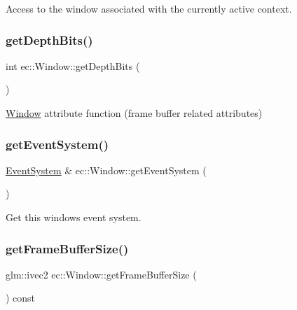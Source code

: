 Access to the window associated with the currently active context. \mbox{\label{classec_1_1_window_a3a30627927e3a7e113100cf43cae340b}} 
\subsubsection{\texorpdfstring{get\+Depth\+Bits()}{getDepthBits()}}
{\footnotesize\ttfamily int ec\+::\+Window\+::get\+Depth\+Bits (\begin{DoxyParamCaption}{ }\end{DoxyParamCaption})\hspace{0.3cm}{\ttfamily [static]}}

\mbox{\hyperlink{classec_1_1_window}{Window}} attribute function (frame buffer related attributes) \mbox{\label{classec_1_1_window_a9dda11a247352aa51fea720076174535}} 
\subsubsection{\texorpdfstring{get\+Event\+System()}{getEventSystem()}}
{\footnotesize\ttfamily \mbox{\hyperlink{classec_1_1_event_system}{Event\+System}} \& ec\+::\+Window\+::get\+Event\+System (\begin{DoxyParamCaption}{ }\end{DoxyParamCaption})}

Get this window\textquotesingle{}s event system. \mbox{\label{classec_1_1_window_a855a303eca483fc69ad278df77f1de4c}} 
\subsubsection{\texorpdfstring{get\+Frame\+Buffer\+Size()}{getFrameBufferSize()}}
{\footnotesize\ttfamily glm\+::ivec2 ec\+::\+Window\+::get\+Frame\+Buffer\+Size (\begin{DoxyParamCaption}{ }\end{DoxyParamCaption}) const}

